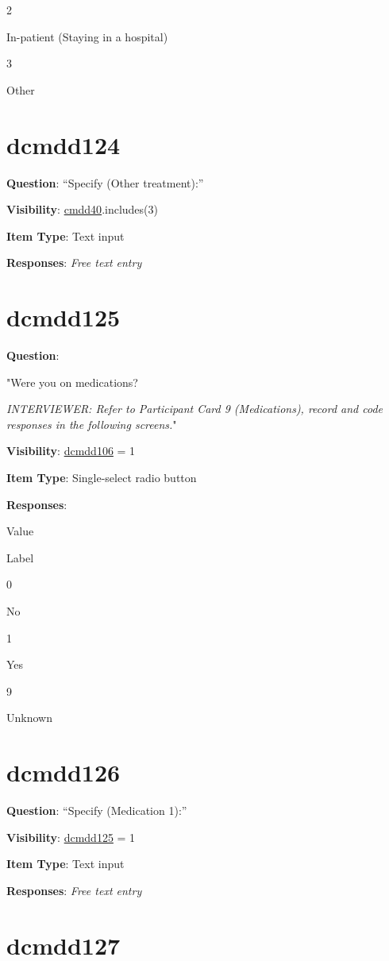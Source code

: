\documentclass[
]{book}
\begin{document}
2

In-patient (Staying in a hospital)

3

Other

\hypertarget{dcmdd124}{%
\section{dcmdd124}\label{dcmdd124}}

\textbf{Question}: ``Specify (Other treatment):''

\textbf{Visibility}: \protect\hyperlink{cmdd40}{cmdd40}.includes(3)

\textbf{Item Type}: Text input

\textbf{Responses}: \emph{Free text entry}

\hypertarget{dcmdd125}{%
\section{dcmdd125}\label{dcmdd125}}

\textbf{Question}:

"Were you on medications?

\emph{INTERVIEWER: Refer to Participant Card 9 (Medications), record and code responses in the following screens.}"

\textbf{Visibility}: \protect\hyperlink{dcmdd106}{dcmdd106} = 1

\textbf{Item Type}: Single-select radio button

\textbf{Responses}:

Value

Label

0

No

1

Yes

9

Unknown

\hypertarget{dcmdd126}{%
\section{dcmdd126}\label{dcmdd126}}

\textbf{Question}: ``Specify (Medication 1):''

\textbf{Visibility}: \protect\hyperlink{dcmdd125}{dcmdd125} = 1

\textbf{Item Type}: Text input

\textbf{Responses}: \emph{Free text entry}

\hypertarget{dcmdd127}{%
\section{dcmdd127}\label{dcmdd127}}
\end{document}
